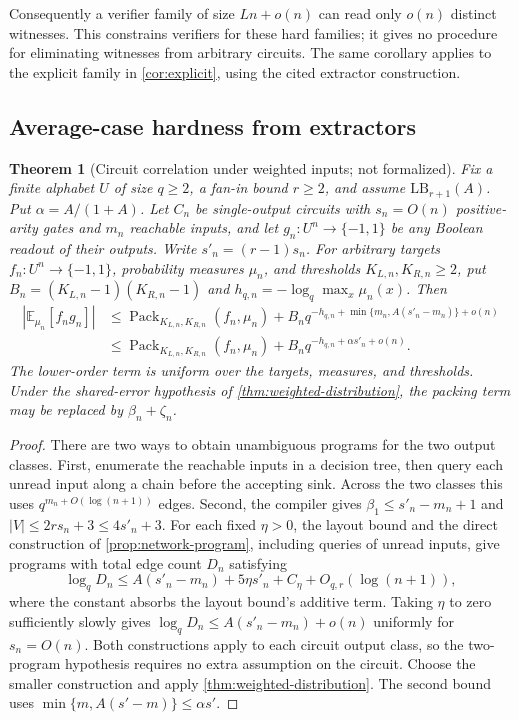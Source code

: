 \documentclass[11pt]{article}
\theoremstyle{plain}
\newtheorem{theorem}{Theorem}[section]
\theoremstyle{definition}
\theoremstyle{remark}
\newcommand{\LB}{\mathrm{LB}}
\begin{document}
Consequently a verifier family of size $Ln+o(n)$ can read only $o(n)$ distinct witnesses.
This constrains verifiers for these hard families; it gives no procedure for eliminating
witnesses from arbitrary circuits. The same corollary applies to the explicit family
in \cref{cor:explicit}, using the cited extractor construction.

\subsection{Average-case hardness from extractors}
\label{sec:average-case}

\begin{theorem}[Circuit correlation under weighted inputs; not formalized]
\label{thm:weighted-circuit}
Fix a finite alphabet $U$ of size $q\ge2$, a fan-in bound $r\ge2$, and assume
$\LB_{r+1}(A)$. Put $\alpha=A/(1+A)$. Let $C_n$ be single-output circuits with
$s_n=O(n)$ positive-arity gates and $m_n$ reachable inputs, and let $g_n:U^n\to\{-1,1\}$
be any Boolean readout of their outputs. Write $s'_n=(r-1)s_n$. For arbitrary targets
$f_n:U^n\to\{-1,1\}$, probability measures $\mu_n$, and thresholds $K_{L,n},K_{R,n}\ge2$,
put $B_n=(K_{L,n}-1)(K_{R,n}-1)$ and $h_{q,n}=-\log_q\max_x\mu_n(x)$. Then
\begin{align*}
  |\mathbb E_{\mu_n}[f_ng_n]|
  &\le \operatorname{Pack}_{K_{L,n},K_{R,n}}(f_n,\mu_n)
      +B_nq^{-h_{q,n}+\min\{m_n,A(s'_n-m_n)\}+o(n)}\\
  &\le \operatorname{Pack}_{K_{L,n},K_{R,n}}(f_n,\mu_n)
      +B_nq^{-h_{q,n}+\alpha s'_n+o(n)}.
\end{align*}
The lower-order term is uniform over the targets, measures, and thresholds.
Under the shared-error hypothesis of \cref{thm:weighted-distribution}, the packing term
may be replaced by $\beta_n+\zeta_n$.
\end{theorem}

\begin{proof}
There are two ways to obtain unambiguous programs for the two output classes.
First, enumerate the reachable inputs in a decision tree, then query each unread input
along a chain before the accepting sink. Across the two classes this uses
$q^{m_n+O(\log(n+1))}$ edges. Second, the compiler gives
$\beta_1\le s'_n-m_n+1$ and $|V|\le2rs_n+3\le4s'_n+3$. For each fixed $\eta>0$,
the layout bound and the direct construction of \cref{prop:network-program}, including
queries of unread inputs, give programs with total edge count $D_n$ satisfying
\[
  \log_q D_n\le A(s'_n-m_n)+5\eta s'_n+C_\eta+O_{q,r}(\log(n+1)),
\]
where the constant absorbs the layout bound's additive term. Taking $\eta$ to zero
sufficiently slowly gives $\log_q D_n\le A(s'_n-m_n)+o(n)$ uniformly for $s_n=O(n)$.
Both constructions apply to each circuit output class, so the two-program hypothesis
requires no extra assumption on the circuit. Choose the smaller construction and apply
\cref{thm:weighted-distribution}. The second bound uses
$\min\{m,A(s'-m)\}\le\alpha s'$.
\end{proof}
\end{document}
